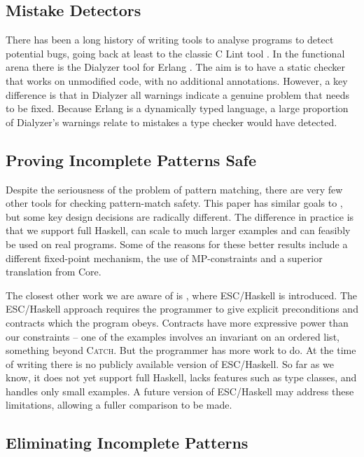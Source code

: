 \documentclass[preprint]{sigplanconf}
\newcommand{\catch}{\textsc{Catch}}
\begin{document}
\subsection{Mistake Detectors}

There has been a long history of writing tools to analyse programs to detect potential bugs, going back at least to the classic C Lint tool \citep{lint}. In the functional arena there is the Dialyzer tool \citep{dialyzer} for Erlang \citep{erlang}. The aim is to have a static checker that works on unmodified code, with no additional annotations. However, a key difference is that in Dialyzer all warnings indicate a genuine problem that needs to be fixed. Because Erlang is a dynamically typed language, a large proportion of Dialyzer's warnings relate to mistakes a type checker would have detected.

\subsection{Proving Incomplete Patterns Safe}

Despite the seriousness of the problem of pattern matching, there are very few other tools for checking pattern-match safety. This paper has similar goals to \citet{me:catch_tfp}, but some key design decisions are radically different. The difference in practice is that we support full Haskell, can scale to much larger examples and can feasibly be used on real programs. Some of the reasons for these better results include a different fixed-point mechanism, the use of MP-constraints and a superior translation from Core.

The closest other work we are aware of is \citep{esc_haskell}, where ESC/Haskell is introduced. The ESC/Haskell approach requires the programmer to give explicit preconditions and contracts which the program obeys. Contracts have more expressive power than our constraints -- one of the examples involves an invariant on an ordered list, something beyond \catch{}. But the programmer has more work to do. At the time of writing there is no publicly available version of ESC/Haskell. So far as we know, it does not yet support full Haskell, lacks features such as type classes, and handles only small examples. A future version of ESC/Haskell may address these limitations, allowing a fuller comparison to be made.


\subsection{Eliminating Incomplete Patterns}
\end{document}

